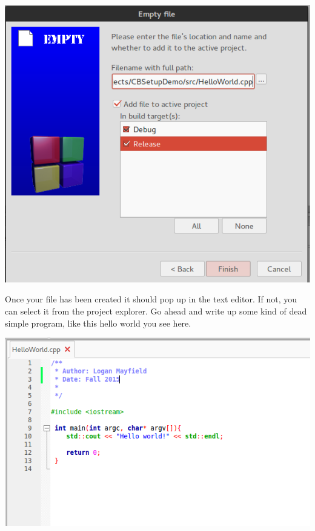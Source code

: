 \documentclass[10pt]{article}
\begin{document}
\vspace{.1in}
\begin{center}
\includegraphics[scale=.5]{CB_NewFileEmptyName.png}
\end{center}
\vspace{.1in}

Once your file has been created it should pop up in the text editor. If not, you can select it from the project explorer. Go ahead and write up some kind of dead simple program, like this hello world you see here.

\vspace{.1in}
\begin{center}
\includegraphics[scale=.5]{CB_HelloWorld.png}
\end{center}
\vspace{.1in}
\end{document}
